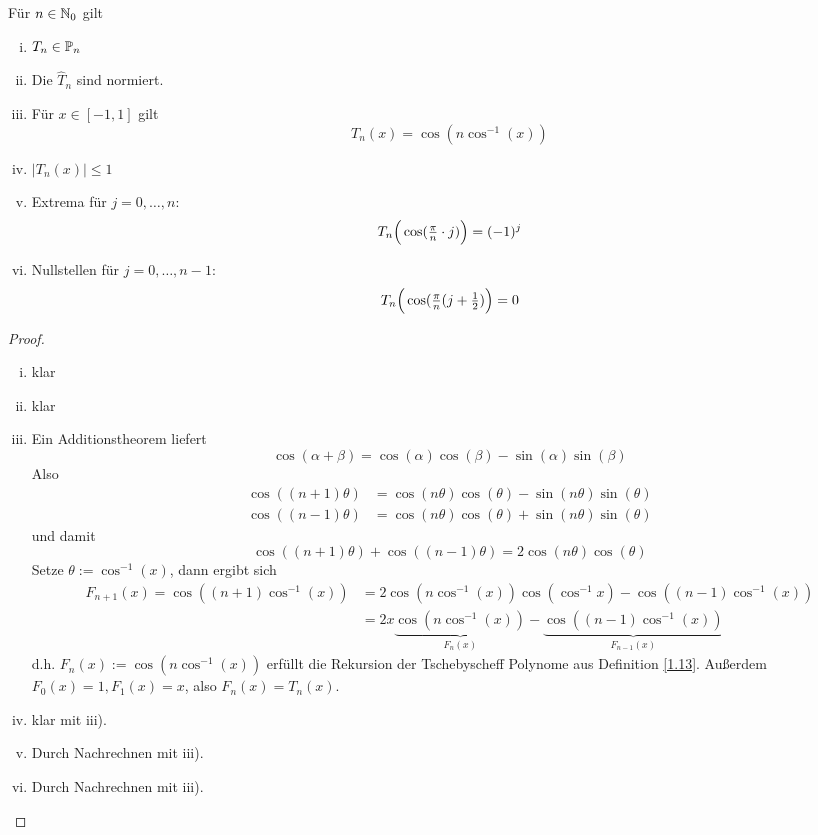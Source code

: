 \documentclass[
]{mycourse}
\begin{document}
\begin{st}
	\label{1.14}
	Für $n\in \N_0$ gilt
	\begin{enumerate}[i)]
		\item 
			$T_n\in \P_n$
		\item
			Die $\hat T_n$ sind normiert.
		\item
			Für $x\in [-1,1]$ gilt
			\[
				T_n(x) = \cos(n\cos^{-1}(x))
			\]
		\item
			$|T_n(x)| \le 1$
		\item
			Extrema für $j=0,\dotsc,n$:
			\[
				T_n\Big(\cos(\tf \pi n \cdot j)\Big) = (-1)^j
			\]
		\item
			Nullstellen für $j=0,\dotsc,n-1$:
			\[
				T_n\Big(\cos(\tf\pi n (j + \tf 12)\Big) = 0
			\]
	\end{enumerate}
	\begin{proof}
		\begin{enumerate}[i)]
			\item klar
			\item klar
			\item
				Ein Additionstheorem liefert
				\[
					\cos(\alpha+\beta) = \cos(\alpha)\cos(\beta) - \sin(\alpha)\sin(\beta)
				\]
				Also
				\begin{align*}
					\cos((n+1)\theta) &= \cos(n\theta) \cos(\theta) - \sin(n\theta) \sin(\theta)\\
					\cos((n-1)\theta) &= \cos(n\theta) \cos(\theta) + \sin(n\theta) \sin(\theta)
				\end{align*}
				und damit
				\[
					\cos((n+1)\theta) + \cos((n-1)\theta) = 2 \cos(n\theta)\cos(\theta)
				\]
				Setze $\theta:= \cos^{-1}(x)$, dann ergibt sich
				\begin{align*}
					F_{n+1}(x) = \cos((n+1)\cos^{-1}(x)) &= 2\cos(n\cos^{-1}(x)) \cos(\cos^{-1}x) - \cos((n-1)\cos^{-1}(x))\\
					&= 2x \underbrace{\cos(n\cos^{-1}(x))}_{F_n(x)} - \underbrace{\cos((n-1)\cos^{-1}(x))}_{F_{n-1}(x)}
				\end{align*}
				d.h. $F_n(x):= \cos(n\cos^{-1}(x))$ erfüllt die Rekursion der Tschebyscheff Polynome aus Definition \ref{1.13}.
				Außerdem  $F_0(x)=1, F_1(x)=x$, also $F_n(x)=T_n(x)$.
			\item
				klar mit iii).
			\item
				Durch Nachrechnen mit iii).
			\item
				Durch Nachrechnen mit iii).
		\end{enumerate}
	\end{proof}
\end{st}
\end{document}
